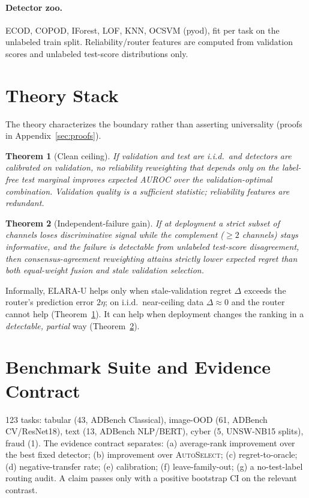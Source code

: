 \documentclass[11pt]{article}
\newtheorem{theorem}{Theorem}
\newcommand{\systemu}{ELARA-U}
\newcommand{\auto}{\textsc{AutoSelect}}
\begin{document}
\paragraph{Detector zoo.} ECOD, COPOD, IForest, LOF, KNN, OCSVM (pyod), fit per task on
the unlabeled train split. Reliability/router features are computed from validation
scores and unlabeled test-score distributions only.

\section{Theory Stack}\label{sec:theory}
The theory characterizes the boundary rather than asserting universality (proofs in
Appendix~\ref{sec:proofs}).

\begin{theorem}[Clean ceiling]\label{thm:clean}
If validation and test are i.i.d.\ and detectors are calibrated on validation, no
reliability reweighting that depends only on the label-free test marginal improves
expected AUROC over the validation-optimal combination. Validation quality is a
sufficient statistic; reliability features are redundant.
\end{theorem}

\begin{theorem}[Independent-failure gain]\label{thm:stress}
If at deployment a strict subset of channels loses discriminative signal while the
complement ($\ge 2$ channels) stays informative, and the failure is detectable from
unlabeled test-score disagreement, then consensus-agreement reweighting attains
strictly lower expected regret than both equal-weight fusion and stale validation
selection.
\end{theorem}

Informally, \systemu{} helps only when stale-validation regret $\Delta$ exceeds the
router's prediction error $2\eta$; on i.i.d.\ near-ceiling data $\Delta\approx 0$ and
the router cannot help (Theorem~\ref{thm:clean}). It can help when deployment changes
the ranking in a \emph{detectable, partial} way (Theorem~\ref{thm:stress}).

\section{Benchmark Suite and Evidence Contract}
123 tasks: tabular (43, ADBench Classical), image-OOD (61, ADBench CV/ResNet18), text
(13, ADBench NLP/BERT), cyber (5, UNSW-NB15 splits), fraud (1). The evidence contract
separates: (a) average-rank improvement over the best fixed detector; (b) improvement
over \auto{}; (c) regret-to-oracle; (d) negative-transfer rate; (e) calibration; (f)
leave-family-out; (g) a no-test-label routing audit. A claim passes only with a
positive bootstrap CI on the relevant contrast.
\end{document}
